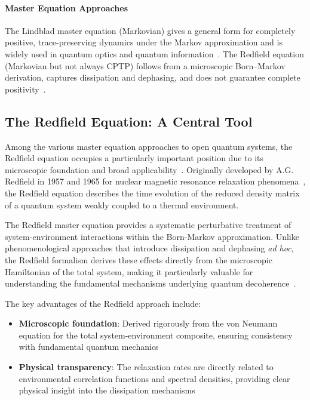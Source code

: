 \paragraph{Master Equation Approaches}
The Lindblad master equation (Markovian) gives a general form for completely positive, trace-preserving dynamics under the Markov approximation and is widely used in quantum optics and quantum information~\cite{breuerpetruccione2009theoryopenquantum, lindblad1976generatorsquantumdynamical}. The Redfield equation (Markovian but not always CPTP) follows from a microscopic Born–Markov derivation, captures dissipation and dephasing, and does not guarantee complete positivity~\cite{redfield1965theoryrelaxationprocesses, rivasetal2014quantumnonmarkovianitycharacterization, lietal2018conceptsquantumnonmarkovianity}.


\subsection{The Redfield Equation: A Central Tool}

Among the various master equation approaches to open quantum systems, the Redfield equation occupies a particularly important position due to its microscopic foundation and broad applicability~\cite{redfield1965theoryrelaxationprocesses, breuerpetruccione2009theoryopenquantum}. Originally developed by A.G. Redfield in 1957 and 1965 for nuclear magnetic resonance relaxation phenomena~\cite{redfield1965theoryrelaxationprocesses}, the Redfield equation describes the time evolution of the reduced density matrix of a quantum system weakly coupled to a thermal environment.

The Redfield master equation provides a systematic perturbative treatment of system-environment interactions within the Born-Markov approximation. Unlike phenomenological approaches that introduce dissipation and dephasing \emph{ad hoc}, the Redfield formalism derives these effects directly from the microscopic Hamiltonian of the total system, making it particularly valuable for understanding the fundamental mechanisms underlying quantum decoherence~\cite{breuerpetruccione2009theoryopenquantum, weiss2012quantumdissipativesystems}.

The key advantages of the Redfield approach include:
\begin{itemize}
	\item \textbf{Microscopic foundation}: Derived rigorously from the von Neumann equation for the total system-environment composite, ensuring consistency with fundamental quantum mechanics~\cite{breuerpetruccione2009theoryopenquantum}
	\item \textbf{Physical transparency}: The relaxation rates are directly related to environmental correlation functions and spectral densities, providing clear physical insight into the dissipation mechanisms~\cite{redfield1965theoryrelaxationprocesses}
\end{itemize}

